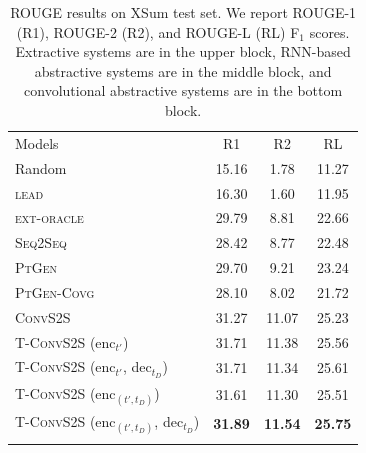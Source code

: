 \begin{table}[t]
  \begin{center}{\fontsize{8.5}{11}\selectfont %
  \begin{tabular}{ l | c c c }
    \thickhline
    Models & R1 & R2 & RL \\ \thickhline
    Random & 15.16 & 1.78 & 11.27 \\ 
    \textsc{lead} & 16.30 & 1.60 & 11.95 \\ 
    \textsc{ext-oracle} & 29.79 & 8.81 & 22.66 \\ \hline
    \textsc{Seq2Seq} &  28.42 & 8.77 &  22.48 \\
    \textsc{PtGen} & 29.70 & 9.21 & 23.24 \\ 
    \textsc{PtGen-Covg} & 28.10 & 8.02 & 21.72 \\ 
    \hline
    \textsc{ConvS2S} & 31.27 & 11.07 & 25.23 \\  %
    \textsc{T-ConvS2S} (enc$_{t'}$) & 31.71 & 11.38 & 25.56 \\
    \textsc{T-ConvS2S} (enc$_{t'}$, dec$_{t_D}$) & 31.71 & 11.34 & 25.61 \\
    \textsc{T-ConvS2S} (enc$_{(t',t_D)}$) & 31.61 & 11.30 & 25.51 \\
    \textsc{T-ConvS2S} (enc$_{(t',t_D)}$, dec$_{t_D}$)  & \textbf{31.89} & \textbf{11.54} & \textbf{25.75} \\ \thickhline %
    
  \end{tabular}
  }\end{center}
\caption{ROUGE results on  XSum test set. We report \mbox{ROUGE-1} (R1), ROUGE-2
  (R2), and ROUGE-L (RL) F$_1$  scores. Extractive systems are in the
  upper block, RNN-based   abstractive systems are in the middle block,
  and convolutional    abstractive systems are in the bottom
  block. \label{tab:rouge}} 
\end{table}

